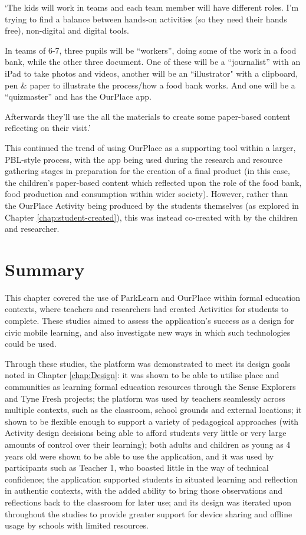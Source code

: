 \begin{displayquote}
`The kids will work in teams and each team member will have different roles. I’m trying to find a balance between hands-on activities (so they need their hands free), non-digital and digital tools.

In teams of 6-7, three pupils will be “workers”, doing some of the work in a food bank, while the other three document. One of these will be a “journalist” with an iPad to take photos and videos, another will be an “illustrator" with a clipboard, pen \& paper to illustrate the process/how a food bank works. And one will be a “quizmaster” and has the OurPlace app.

Afterwards they’ll use the all the materials to create some paper-based content reflecting on their visit.'
\end{displayquote}

This continued the trend of using OurPlace as a supporting tool within a larger, PBL-style process, with the app being used during the research and resource gathering stages in preparation for the creation of a final product (in this case, the children's paper-based content which reflected upon the role of the food bank, food production and consumption within wider society). However, rather than the OurPlace Activity being produced by the students themselves (as explored in Chapter \ref{chap:student-created}), this was instead co-created with by the children and researcher.

\section{Summary}

This chapter covered the use of ParkLearn and OurPlace within formal education contexts, where teachers and researchers had created Activities for students to complete. These studies aimed to assess the application's success as a design for civic mobile learning, and also investigate new ways in which such technologies could be used. 

Through these studies, the platform was demonstrated to meet its design goals noted in Chapter \ref{chap:Design}: it was shown to be able to utilise place and communities as learning formal education resources through the Sense Explorers and Tyne Fresh projects; the platform was used by teachers seamlessly across multiple contexts, such as the classroom, school grounds and external locations; it shown to be flexible enough to support a variety of pedagogical approaches (with Activity design decisions being able to afford students very little or very large amounts of control over their learning); both adults and children as young as 4 years old were shown to be able to use the application, and it was used by participants such as Teacher 1, who boasted little in the way of technical confidence; the application supported students in situated learning and reflection in authentic contexts, with the added ability to bring those observations and reflections back to the classroom for later use; and its design was iterated upon throughout the studies to provide greater support for device sharing and offline usage by schools with limited resources. 

